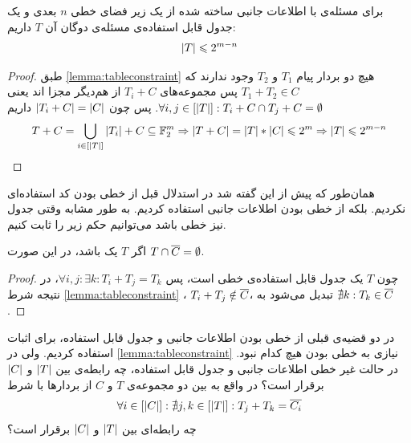 \begin{theorem}
	برای مسئله‌ی
	\picod
	با اطلاعات جانبی ساخته شده از یک زیر فضای خطی
	$n$
	بعدی و یک جدول قابل استفاده‌ی مسئله‌ی دوگان آن
	$T$
	داریم:
	\begin{align*}
		\left|{T}\right| \leqslant 2^{m - n}
	\end{align*}
\end{theorem}
\begin{proof}
	طبق
	\autoref{lemma:tableconstraint}
	هیچ دو بردار پیام
	$T_1$
	و
	$T_2$
	وجود ندارند که
	$T_1 + T_2 \in C$
	پس مجموعه‌های
	$T_i + C$
	از هم‌دیگر مجزا اند یعنی
	$\forall i, j \in [\left|{T}\right|]: T_i + C \cap T_j + C = \emptyset$.
 پس چون
	$\left|{T_i + C}\right| = \left|{C}\right|$
	داریم
	\begin{align}
	T + C =  \bigcup_{i \in [\left|{T}\right|]} \left|{T_i}\right| + C \subseteq \mathbb{F}_2^m \Rightarrow \left|{T + C}\right| = \left|{T }\right| * \left|{C}\right| \leqslant 2^m \Rightarrow \left|{T}\right| \leqslant 2^{m - n}
		\end{align}
\end{proof}

همان‌طور که پیش از این گفته شد در استدلال قبل از خطی بودن کد استفاده‌ای نکردیم. بلکه از خطی بودن اطلاعات جانبی استفاده کردیم. به طور مشابه وقتی جدول نیز خطی باشد می‌توانیم حکم زیر را ثابت کنیم.
\begin{theorem}
	اگر 
	$T$
	یک 
	باشد، در این صورت
	$T \cap \overline{C} = \emptyset$.
\end{theorem}
\begin{proof}
	چون
	$T$
	یک جدول قابل استفاده‌ی خطی است، پس
	$\forall i, j: \exists k: T_i + T_j = T_k$،
	در نتیجه شرط
	\autoref{lemma:tableconstraint}
	،
	$T_i + T_j \notin \overline{C}$،
	تبدیل می‌شود به
	$\nexists k: T_k \in \overline{C}$.
\end{proof}

\begin{openproblem}
	در دو قضیه‌ی قبلی از خطی بودن اطلاعات جانبی و جدول قابل استفاده، برای اثبات استفاده کردیم. ولی در
	\autoref{lemma:tableconstraint}
	نیازی به خطی بودن هیچ کدام نبود. در حالت غیر خطی اطلاعات جانبی و جدول قابل استفاده، چه رابطه‌ی بین
	$\left|{T}\right|$
	و
	$\left|{C}\right|$
	برقرار است؟ در واقع به بین دو مجموعه‌ی
	$T$
	و
	$C$
	 از بردارها با شرط
 	\begin{align}
	 	\forall i \in [\left|{C}\right|]: \nexists j, k \in [\left|{T}\right|]: T_j + T_k = \overline{C_i}
	 \end{align}
	 چه رابطه‌ای بین
	 	$\left|{T}\right|$
	 و
	 $\left|{C}\right|$
	 برقرار است؟
\end{openproblem}















